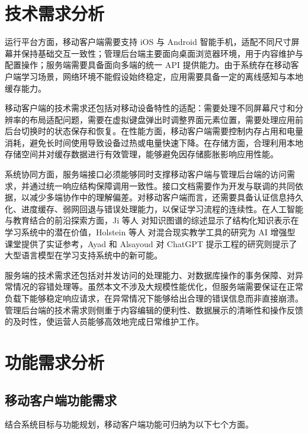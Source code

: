 \section{技术需求分析}

运行平台方面，移动客户端需要支持 iOS 与 Android 智能手机，适配不同尺寸屏幕并保持基础交互一致性；管理后台端主要面向桌面浏览器环境，用于内容维护与配置操作；服务端需要具备面向多端的统一 API 提供能力。由于系统存在移动客户端学习场景，网络环境不能假设始终稳定，应用需要具备一定的离线感知与本地缓存能力\cite{liang2018,jiao2023}。

移动客户端的技术需求还包括对移动设备特性的适配：需要处理不同屏幕尺寸和分辨率的布局适配问题，需要在虚拟键盘弹出时调整界面元素位置，需要处理应用前后台切换时的状态保存和恢复。在性能方面，移动客户端需要控制内存占用和电量消耗，避免长时间使用导致设备过热或电量快速下降。在存储方面，合理利用本地存储空间并对缓存数据进行有效管理，能够避免因存储膨胀影响应用性能。

系统协同方面，服务端接口必须能够同时支撑移动客户端与管理后台端的访问需求，并通过统一响应结构保障调用一致性。接口文档需要作为开发与联调的共同依据，以减少多端协作中的理解偏差。对移动客户端而言，还需要具备认证信息持久化、进度缓存、弱网回退与错误处理能力，以保证学习流程的连续性\cite{brusilovsky2007,papamitsiou2014,sommerville2015}。在人工智能与教育结合的前沿探索方面，Ji 等人\cite{ji2022} 对知识图谱的综述显示了结构化知识表示在学习系统中的潜在价值，Holstein 等人\cite{holstein2018} 对混合现实教学工具的研究为 AI 增强型课堂提供了实证参考，Ayad 和 Alsayoud\cite{ayad2024} 对 ChatGPT 提示工程的研究则提示了大型语言模型在学习支持系统中的新可能。

服务端的技术需求还包括对并发访问的处理能力、对数据库操作的事务保障、对异常情况的容错处理等。虽然本文不涉及大规模性能优化，但服务端需要保证在正常负载下能够稳定响应请求，在异常情况下能够给出合理的错误信息而非直接崩溃。管理后台端的技术需求则侧重于内容编辑的便利性、数据展示的清晰性和操作反馈的及时性，使运营人员能够高效地完成日常维护工作。

\section{功能需求分析}

\subsection{移动客户端功能需求}

结合系统目标与功能规划，移动客户端功能可归纳为以下七个方面。

